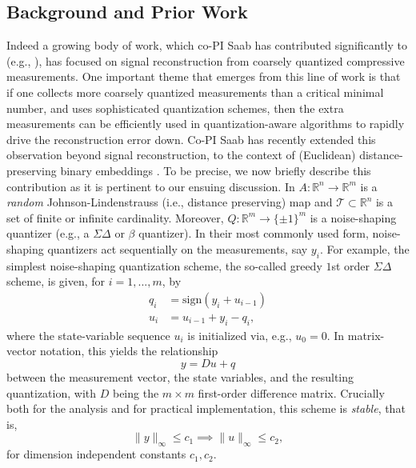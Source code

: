 \documentclass{article}
\newcommand{\R}{\mathbb{R}}
\newcommand{\sign}{\mathrm{sign}}
\begin{document}
\subsection{Background and Prior Work}Indeed a growing body of work, which co-PI Saab has contributed significantly to (e.g., \cite{SaabIEEEIT,knudson2016one,saab2018quantization,LybrandSaab2018,iwen2019new}), has focused on signal reconstruction from coarsely quantized compressive measurements. One important theme that emerges from this line of work  is that if one collects more coarsely quantized measurements than a critical minimal number, and uses sophisticated quantization schemes, then the extra measurements can be efficiently used in quantization-aware algorithms to rapidly drive the reconstruction error down.
Co-PI Saab has recently  extended this observation  beyond signal reconstruction, to the context of (Euclidean) distance-preserving binary embeddings \cite{huynh2018fast}. To be precise, we now briefly describe this contribution as it is pertinent to our ensuing discussion. In \cite{huynh2018fast}  $A: \R^n \to \R^m$ is a \emph{random} Johnson-Lindenstrauss (i.e., distance preserving) map and  $\mathcal{T}\subset \R^n$ is a set of finite or infinite cardinality. Moreover, $Q:\R^m \to \{\pm 1\}^m$ is a noise-shaping quantizer (e.g., a $\Sigma\Delta$ \cite{stuff} or $\beta$ \cite{stuff} quantizer). In their most commonly used form, noise-shaping quantizers act sequentially on the measurements, say $y_i$. For example, the simplest noise-shaping quantization scheme, the so-called greedy $1$st order $\Sigma\Delta$ scheme, is given, for $i=1,...,m$, by 
\begin{align}
    q_i &= \sign(y_i+u_{i-1})\\
    u_i &= u_{i-1} + y_i -q_i,
\end{align}
where the state-variable sequence $u_i$ is initialized via, e.g., $u_0=0$. In matrix-vector notation, this yields the relationship \begin{equation}y=Du+q\label{eq:SD_state}\end{equation}  between the measurement vector, the state variables, and the resulting quantization, with $D$ being the $m\times m$ first-order difference matrix. Crucially both for the analysis and for practical implementation, this scheme is \emph{stable}, that is, \begin{equation}\|y\|_\infty \leq c_1 \implies \|u\|_\infty \leq c_2,\label{eq:stability}\end{equation}
for dimension independent constants $c_1,c_2$.
\end{document}
